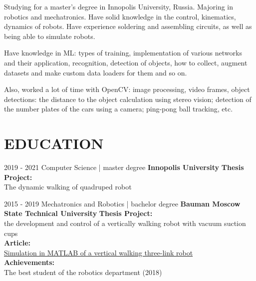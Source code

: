 \documentclass[]{friggeri-cv_reccius-experiment}
\begin{document}
Studying for a master's degree in Innopolis University, Russia. Majoring in robotics and mechatronics. Have solid knowledge in the control, kinematics, dynamics of robots. Have experience soldering and assembling circuits, as well as being able to simulate robots.  

Have knowledge in ML: types of training, implementation of various networks and their application, recognition, detection of objects, how to collect, augment datasets and make custom data loaders for them and so on.

Also, worked a lot of time with OpenCV: image processing, video frames, object detections:  the distance to the object calculation using stereo vision; detection of the number plates of the cars using a camera; ping-pong ball tracking, etc.

\section{EDUCATION}
\begin{entrylist}
    
  \entry
    {2019 - 2021\enspace}
    {Computer Science | }{\Large\thinspace\normalsize master degree}
    {\normalsize\textbf{\color{ipsgreen}\faMapMarker\space Innopolis University}}
    {\textbf{Thesis Project:} \\The dynamic walking of quadruped robot
    \eduspace\\}

  \entry
    {2015 - 2019\enspace}
    {Mechatronics and Robotics | } {\Large\thinspace\normalsize bachelor degree}
    {\normalsize\textbf{\color{ipsgreen}\faMapMarker\space Bauman Moscow State Technical University}
    }
    {\textbf{Thesis Project:} \\the development and control of a vertically walking robot with vacuum suction cups \\
    \textbf{Article:} \\\href{https://aip.scitation.org/doi/abs/10.1063/1.5140108}{Simulation in MATLAB of a vertical walking three-link robot \faMousePointer} \\
    \textbf{Achievements:} \\The best student of the robotics department (2018)}
\end{entrylist}
\end{document}
